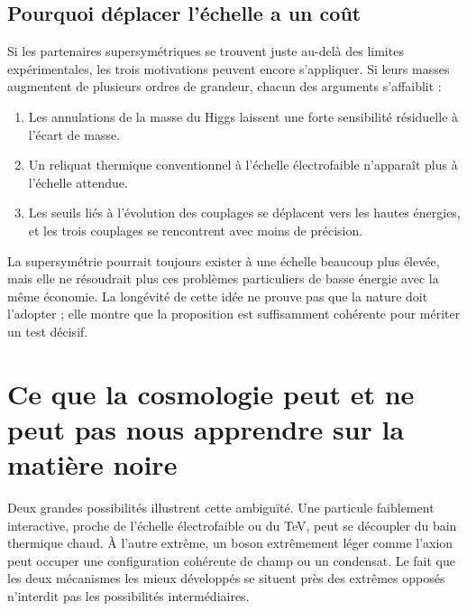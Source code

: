 \subsection{Pourquoi déplacer l’échelle a un coût}

Si les partenaires supersymétriques se trouvent juste au-delà des limites expérimentales, les trois motivations peuvent encore s’appliquer. Si leurs masses augmentent de plusieurs ordres de grandeur, chacun des arguments s’affaiblit :
\begin{enumerate}
\item Les annulations de la masse du Higgs laissent une forte sensibilité résiduelle à l’écart de masse.
\item Un reliquat thermique conventionnel à l’échelle électrofaible n’apparaît plus à l’échelle attendue.
\item Les seuils liés à l’évolution des couplages se déplacent vers les hautes énergies, et les trois couplages se rencontrent avec moins de précision.
\end{enumerate}
La supersymétrie pourrait toujours exister à une échelle beaucoup plus élevée, mais elle ne résoudrait plus ces problèmes particuliers de basse énergie avec la même économie. La longévité de cette idée ne prouve pas que la nature doit l’adopter ; elle montre que la proposition est suffisamment cohérente pour mériter un test décisif.

\section{Ce que la cosmologie peut et ne peut pas nous apprendre sur la matière noire}

\begin{classroomqa}
\end{classroomqa}

Deux grandes possibilités illustrent cette ambiguïté. Une particule faiblement interactive, proche de l’échelle électrofaible ou du TeV, peut se découpler du bain thermique chaud. À l’autre extrême, un boson extrêmement léger comme l’axion peut occuper une configuration cohérente de champ ou un condensat. Le fait que les deux mécanismes les mieux développés se situent près des extrêmes opposés n’interdit pas les possibilités intermédiaires.

